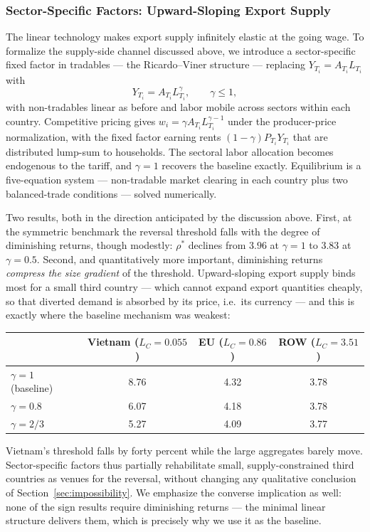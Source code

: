 \documentclass[11pt]{article}
\theoremstyle{plain}
\theoremstyle{remark}
\numberwithin{lemma}{section}
\numberwithin{proposition}{section}
\numberwithin{corollary}{section}
\newenvironment{revblock}{\par\begingroup\color{RevBlue}}{\endgroup\par}
\begin{document}
\begin{revblock}
\subsubsection{Sector-Specific Factors: Upward-Sloping Export Supply}
\label{sec:rv}

The linear technology makes export supply infinitely elastic at the going wage. To formalize the supply-side channel discussed above, we introduce a sector-specific fixed factor in tradables --- the Ricardo--Viner structure --- replacing $Y_{T_i} = A_{T_i} L_{T_i}$ with
\[
Y_{T_i} = A_{T_i} L_{T_i}^{\gamma}, \qquad \gamma \le 1,
\]
with non-tradables linear as before and labor mobile across sectors within each country. Competitive pricing gives $w_i = \gamma A_{T_i} L_{T_i}^{\gamma-1}$ under the producer-price normalization, with the fixed factor earning rents $(1-\gamma) P_{T_i} Y_{T_i}$ that are distributed lump-sum to households. The sectoral labor allocation becomes endogenous to the tariff, and $\gamma = 1$ recovers the baseline exactly. Equilibrium is a five-equation system --- non-tradable market clearing in each country plus two balanced-trade conditions --- solved numerically.

Two results, both in the direction anticipated by the discussion above. First, at the symmetric benchmark the reversal threshold falls with the degree of diminishing returns, though modestly: $\rho^*$ declines from $3.96$ at $\gamma = 1$ to $3.83$ at $\gamma = 0.5$. Second, and quantitatively more important, diminishing returns \emph{compress the size gradient} of the threshold. Upward-sloping export supply binds most for a small third country --- which cannot expand export quantities cheaply, so that diverted demand is absorbed by its price, i.e.\ its currency --- and this is exactly where the baseline mechanism was weakest:
\begin{center}
\begin{tabular}{lccc}
\hline
 & Vietnam ($L_C = 0.055$) & EU ($L_C = 0.86$) & ROW ($L_C = 3.51$) \\
\hline
$\gamma = 1$ (baseline) & 8.76 & 4.32 & 3.78 \\
$\gamma = 0.8$          & 6.07 & 4.18 & 3.78 \\
$\gamma = 2/3$          & 5.27 & 4.09 & 3.77 \\
\hline
\end{tabular}
\end{center}
Vietnam's threshold falls by forty percent while the large aggregates barely move. Sector-specific factors thus partially rehabilitate small, supply-constrained third countries as venues for the reversal, without changing any qualitative conclusion of Section~\ref{sec:impossibility}. We emphasize the converse implication as well: none of the sign results require diminishing returns --- the minimal linear structure delivers them, which is precisely why we use it as the baseline.


\end{revblock}
\end{document}
